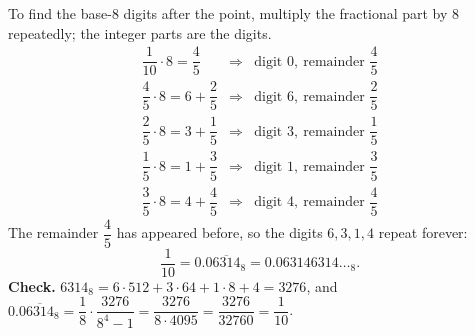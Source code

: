 To find the base-$8$ digits after the point, multiply the fractional part by $8$ repeatedly; the integer parts are the digits.
\[\begin{array}{rcl}
\dfrac{1}{10}\cdot8=\dfrac{4}{5}&\Rightarrow&\text{digit }0,\ \text{remainder }\dfrac{4}{5}\\[2mm]
\dfrac{4}{5}\cdot8=6+\dfrac{2}{5}&\Rightarrow&\text{digit }6,\ \text{remainder }\dfrac{2}{5}\\[2mm]
\dfrac{2}{5}\cdot8=3+\dfrac{1}{5}&\Rightarrow&\text{digit }3,\ \text{remainder }\dfrac{1}{5}\\[2mm]
\dfrac{1}{5}\cdot8=1+\dfrac{3}{5}&\Rightarrow&\text{digit }1,\ \text{remainder }\dfrac{3}{5}\\[2mm]
\dfrac{3}{5}\cdot8=4+\dfrac{4}{5}&\Rightarrow&\text{digit }4,\ \text{remainder }\dfrac{4}{5}
\end{array}\]
The remainder $\dfrac{4}{5}$ has appeared before, so the digits $6,3,1,4$ repeat forever:
\[\dfrac{1}{10}=\boxed{0.0\overline{6314}_8}=0.063146314\ldots_8.\]
\textbf{Check.} $6314_8=6\cdot512+3\cdot64+1\cdot8+4=3276$, and $0.0\overline{6314}_8=\dfrac{1}{8}\cdot\dfrac{3276}{8^4-1}=\dfrac{3276}{8\cdot4095}=\dfrac{3276}{32760}=\dfrac{1}{10}$.
